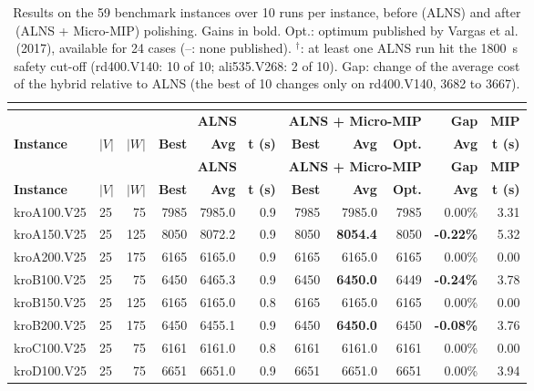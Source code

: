 {\scriptsize\setlength{\tabcolsep}{2.5pt}
\begin{longtable}{llr rrr rrr r r}
\caption{Results on the 59 benchmark instances over 10 runs per instance, before (ALNS) and after (ALNS + Micro-MIP) polishing. Gains in bold. Opt.: optimum published by Vargas et al. (2017), available for 24 cases (--: none published). $^\dagger$: at least one ALNS run hit the 1800~s safety cut-off (rd400.V140: 10 of 10; ali535.V268: 2 of 10). Gap: change of the average cost of the hybrid relative to ALNS (the best of 10 changes only on rd400.V140, 3682 to 3667).}\\
\label{tab:all59_results}\\
\toprule
 & & & \multicolumn{3}{c}{\textbf{ALNS}} & \multicolumn{3}{c}{\textbf{ALNS + Micro-MIP}} & \textbf{Gap} & \textbf{MIP} \\
\cmidrule(lr){4-6} \cmidrule(lr){7-9}
\textbf{Instance} & $|V|$ & $|W|$ & \textbf{Best} & \textbf{Avg} & \textbf{t (s)} & \textbf{Best} & \textbf{Avg} & \textbf{Opt.} & \textbf{Avg} & \textbf{t (s)} \\
\midrule
\endfirsthead
\toprule
 & & & \multicolumn{3}{c}{\textbf{ALNS}} & \multicolumn{3}{c}{\textbf{ALNS + Micro-MIP}} & \textbf{Gap} & \textbf{MIP} \\
\cmidrule(lr){4-6} \cmidrule(lr){7-9}
\textbf{Instance} & $|V|$ & $|W|$ & \textbf{Best} & \textbf{Avg} & \textbf{t (s)} & \textbf{Best} & \textbf{Avg} & \textbf{Opt.} & \textbf{Avg} & \textbf{t (s)} \\
\midrule
\endhead
\bottomrule
\endfoot
kroA100.V25 & 25 & 75 & 7985 & 7985.0 & 0.9 & 7985 & 7985.0 & 7985 & 0.00\% & 3.31 \\
kroA150.V25 & 25 & 125 & 8050 & 8072.2 & 0.9 & 8050 & \textbf{8054.4} & 8050 & \textbf{-0.22\%} & 5.32 \\
kroA200.V25 & 25 & 175 & 6165 & 6165.0 & 0.9 & 6165 & 6165.0 & 6165 & 0.00\% & 0.00 \\
kroB100.V25 & 25 & 75 & 6450 & 6465.3 & 0.9 & 6450 & \textbf{6450.0} & 6449 & \textbf{-0.24\%} & 3.78 \\
kroB150.V25 & 25 & 125 & 6165 & 6165.0 & 0.8 & 6165 & 6165.0 & 6165 & 0.00\% & 0.00 \\
kroB200.V25 & 25 & 175 & 6450 & 6455.1 & 0.9 & 6450 & \textbf{6450.0} & 6450 & \textbf{-0.08\%} & 3.76 \\
kroC100.V25 & 25 & 75 & 6161 & 6161.0 & 0.8 & 6161 & 6161.0 & 6161 & 0.00\% & 0.00 \\
kroD100.V25 & 25 & 75 & 6651 & 6651.0 & 0.9 & 6651 & 6651.0 & 6651 & 0.00\% & 3.94 \\

\end{longtable}}
